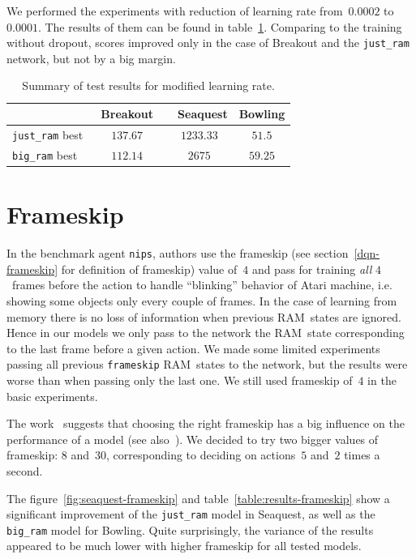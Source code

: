 We performed the experiments with reduction of learning rate from~$0.0002$ to~$0.0001$. The results of them can be found in table~\ref{table:rate}. Comparing to the training without dropout, scores improved only in the case of Breakout and the \texttt{just\_ram} network, but not by a big margin.

\begin{table}[h]
\centering
\begin{tabularx}{0.7\textwidth}{ X c c c }
  \toprule
  &\ Breakout\ &\ Seaquest & Bowling \\
  \midrule
  \texttt{just\_ram} best & $137.67$ & $1233.33$ & $51.5$ \\
  \texttt{big\_ram} best  & $112.14$ & $2675$ & $59.25$ \\
  \bottomrule
\end{tabularx}
\caption{Summary of test results for modified learning rate.}
\label{table:rate}
\end{table}
\section{Frameskip}\label{our-frameskip}
In the benchmark agent \texttt{nips}, authors use the frameskip (see section~\ref{dqn-frameskip} for definition of frameskip) value of~$4$ and pass for training \emph{all} $4$~frames before the action to handle ``blinking'' behavior of Atari machine, i.e. showing some objects only every couple of frames.
In the case of learning from memory there is no loss of information when previous RAM~states are ignored. Hence in our models we only pass to the network the RAM~state corresponding to the last frame before a given action. We made some limited experiments passing all previous \texttt{frameskip} RAM~states to the network, but the results were worse than when passing only the last one. We still used frameskip of~$4$ in the basic experiments.

The work~\cite{frameskip} suggests that choosing the right frameskip has a big influence on the performance of a model (see also~\cite{microsoft-frameskip}). We decided to try two bigger values of frameskip: $8$ and~$30$, corresponding to deciding on actions~$5$ and~$2$ times a second.

The figure~\ref{fig:seaquest-frameskip} and table~\ref{table:results-frameskip} show a significant improvement of the \texttt{just\_ram} model in Seaquest, as well as the \texttt{big\_ram} model for Bowling. Quite surprisingly, the variance of the results appeared to be much lower with higher frameskip for all tested models.

